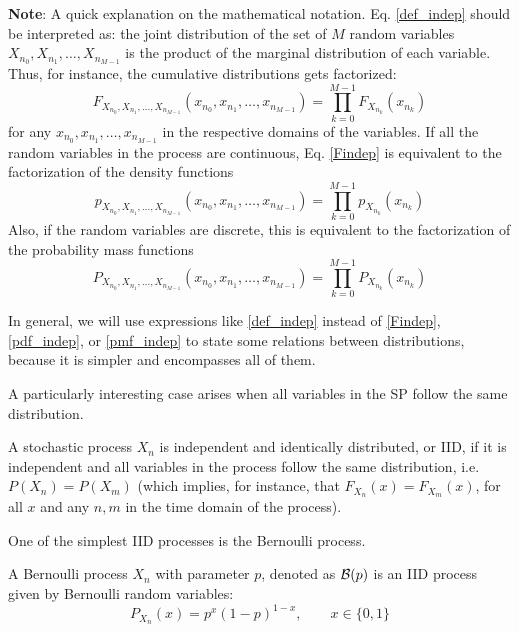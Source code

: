 \textbf{Note}: A quick explanation on the mathematical notation. Eq. \eqref{def_indep} should be interpreted as: the joint distribution of the set of $M$ random variables $X_{n_0}, X_{n_1}, \ldots, X_{n_{M-1}}$ is the product of the marginal distribution of each variable. Thus, for instance, the cumulative distributions gets factorized:
\begin{equation}
\label{Findep}
F_{X_{n_0}, X_{n_1}, \ldots, X_{n_{M-1}}}(x_{n_0}, x_{n_1}, \ldots, x_{n_{M-1}}) = \prod_{k=0}^{M-1} F_{X_{n_k}}(x_{n_k})
\end{equation}
for any $x_{n_0}, x_{n_1}, \ldots, x_{n_{M-1}}$ in the respective domains of the variables. If all the random variables in the process are continuous, Eq. \eqref{Findep} is equivalent to the factorization of the density functions
\begin{equation}
\label{pdf_indep}
p_{X_{n_0}, X_{n_1}, \ldots, X_{n_{M-1}}}(x_{n_0}, x_{n_1}, \ldots, x_{n_{M-1}}) = \prod_{k=0}^{M-1} p_{X_{n_k}}(x_{n_k})
\end{equation}
Also, if the random variables are discrete, this is equivalent to the factorization of the probability mass functions
\begin{equation}
\label{pmf_indep}
P_{X_{n_0}, X_{n_1}, \ldots, X_{n_{M-1}}}(x_{n_0}, x_{n_1}, \ldots, x_{n_{M-1}}) = \prod_{k=0}^{M-1} P_{X_{n_k}}(x_{n_k})
\end{equation}

In general, we will use expressions like \eqref{def_indep} instead of \eqref{Findep}, \eqref{pdf_indep}, or \eqref{pmf_indep} to state some relations between distributions, because it is simpler and encompasses all of them.

A particularly interesting case arises when all variables in the SP follow the same distribution.

\begin{definition}

A stochastic process $X_n$ is independent and identically distributed, or IID, if it is independent and all variables in the process follow the same distribution, i.e. $P(X_n)=P(X_m)$ (which implies, for instance, that $F_{X_n}(x)= F_{X_m}(x)$, for all $x$ and any $n, m$ in the time domain of the process).
\end{definition}

One of the simplest IID processes is the Bernoulli process.

\begin{example}
A Bernoulli process $X_n$ with parameter $p$, denoted as ${\cal B}(p)$ is an IID process given by Bernoulli random variables:
\begin{equation}
\label{SP:Bernoulli}
P_{X_n}(x) = p^x (1-p)^{1-x},  \qquad x \in \{0, 1\}
\end{equation}
\end{example}

